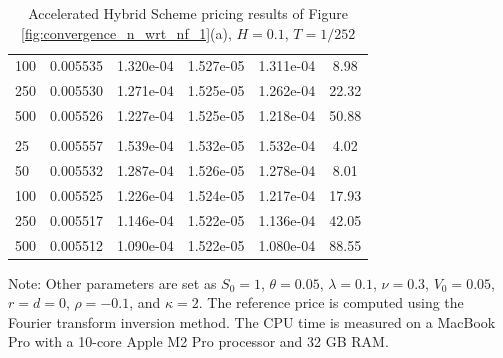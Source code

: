 \documentclass[11pt]{article}%
\theoremstyle{definition}
\begin{document}
\begin{table}[tph]
\begin{center}
\begin{tabular}{lccccc}
     100 & 0.005535 & 1.320e-04 & 1.527e-05 & 1.311e-04 & 8.98 \\
     250 & 0.005530 & 1.271e-04 & 1.525e-05 & 1.262e-04 & 22.32 \\
     500 & 0.005526 & 1.227e-04 & 1.525e-05 & 1.218e-04 & 50.88 \\
    \addlinespace
    \multicolumn{6}{l}{$n_f = 800$, $\text{Reference Price} = 0.005404$} \\
      25 & 0.005557 & 1.539e-04 & 1.532e-05 & 1.532e-04 & 4.02 \\
      50 & 0.005532 & 1.287e-04 & 1.526e-05 & 1.278e-04 & 8.01 \\
     100 & 0.005525 & 1.226e-04 & 1.524e-05 & 1.217e-04 & 17.93 \\
     250 & 0.005517 & 1.146e-04 & 1.522e-05 & 1.136e-04 & 42.05 \\
     500 & 0.005512 & 1.090e-04 & 1.522e-05 & 1.080e-04 & 88.55 \\
    \hline
  \end{tabular}
  \caption{Accelerated Hybrid Scheme pricing results of Figure \ref{fig:convergence_n_wrt_nf_1}(a), $H=0.1$, $T=1/252$}
  \label{tab:sim_results_groupByNf_1Day_point1H}
  \end{center}

  \begin{small}%
Note: Other parameters are set as \(S_0 = 1\), \(\theta = 0.05\), \(\lambda = 0.1\), \(\nu = 0.3\), \(V_0 = 0.05\), \(r=d=0\), \(\rho=-0.1\), and \(\kappa = 2\). The reference price is computed using the Fourier transform inversion method. The CPU time is measured on a MacBook Pro with a 10-core Apple M2 Pro processor and 32 GB RAM.
\end{small}
\end{table}
\end{document}
